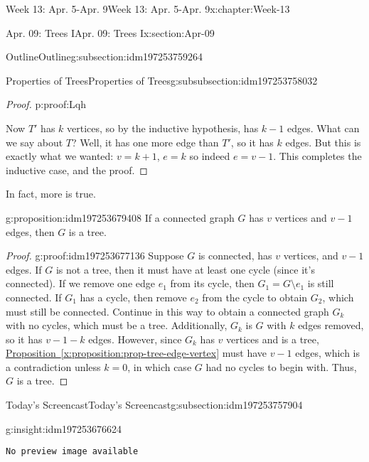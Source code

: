 \documentclass[oneside,10pt,]{book}
\newcommand{\xreffont}{\relax}
\newcommand{\mono}[1]{\texttt{#1}}
\numberwithin{equation}{section}
\newlength{\qrsize}
\newlength{\previewwidth}
\begin{document}
\begin{chapterptx}{Week 13: Apr. 5-Apr. 9}{}{Week 13: Apr. 5-Apr. 9}{}{}{x:chapter:Week-13}
\begin{sectionptx}{Apr. 09: Trees I}{}{Apr. 09: Trees I}{}{}{x:section:Apr-09}
\begin{subsectionptx}{Outline}{}{Outline}{}{}{g:subsection:idm197253759264}
\begin{subsubsectionptx}{Properties of Trees}{}{Properties of Trees}{}{}{g:subsubsection:idm197253758032}
\begin{proof}{}{p:proof:Lqh}
\par
Now \(T'\) has \(k\) vertices, so by the inductive hypothesis, has \(k-1\) edges.  What can we say about \(T\)?  Well, it has one more edge than \(T'\), so it has \(k\) edges.  But this is exactly what we wanted: \(v=k+1\), \(e=k\) so indeed \(e = v-1\).  This completes the inductive case, and the proof.%
\end{proof}
In fact, more is true.%
\begin{proposition}{}{}{g:proposition:idm197253679408}%
If a connected graph \(G\) has \(v\) vertices and \(v-1\) edges, then \(G\) is a tree.%
\end{proposition}
\begin{proof}{}{g:proof:idm197253677136}
Suppose \(G\) is connected, has \(v\) vertices, and \(v-1\) edges. If \(G\) is not a tree, then it must have at least one cycle (since it's connected). If we remove one edge \(e_1\) from its cycle, then \(G_1 = G\setminus e_1\) is still connected. If \(G_1\) has a cycle, then remove \(e_2\) from the cycle to obtain \(G_2\), which must still be connected. Continue in this way to obtain a connected graph \(G_k\) with no cycles, which must be a tree. Additionally, \(G_k\) is \(G\) with \(k\) edges removed, so it has \(v-1-k\) edges. However, since \(G_k\) has \(v\) vertices and is a tree, \hyperref[x:proposition:prop-tree-edge-vertex]{Proposition~{\xreffont\ref{x:proposition:prop-tree-edge-vertex}}}  must have \(v-1\) edges, which is a contradiction unless \(k=0\), in which case \(G\) had no cycles to begin with. Thus, \(G\) is a tree.%
\end{proof}
\end{subsubsectionptx}
\end{subsectionptx}
%
%
\typeout{************************************************}
\typeout{************************************************}
%
\begin{subsectionptx}{Today's Screencast}{}{Today's Screencast}{}{}{g:subsection:idm197253757904}
\begin{insight}{}{g:insight:idm197253676624}%
\setlength{\qrsize}{9em}
\setlength{\previewwidth}{\linewidth}
\addtolength{\previewwidth}{-\qrsize}
\begin{tcbraster}[raster columns=2, raster column skip=1pt, raster halign=center, raster force size=false, raster left skip=0pt, raster right skip=0pt]%
\begin{tcolorbox}[previewstyle, width=\previewwidth]%
\mono{No preview image available}%
\end{tcolorbox}%

\end{tcbraster}
\end{insight}
\end{subsectionptx}
\end{sectionptx}
\end{chapterptx}
\end{document}
